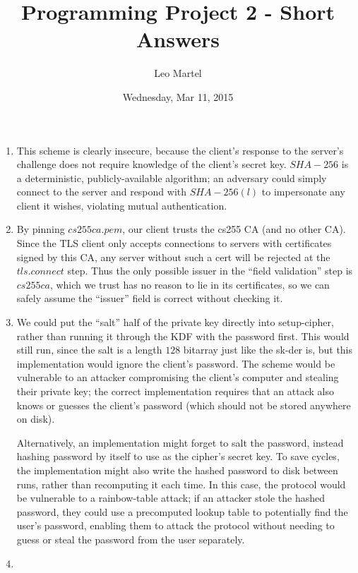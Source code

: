 \documentclass{article}[12pt]
\title{Programming Project 2 - Short Answers}
\author{Leo Martel}
\date{Wednesday, Mar 11, 2015}
\begin{document}
\maketitle

\begin{enumerate}[1.]

\item This scheme is clearly insecure, because the client's response to the server's challenge does not require knowledge of the client's secret key. $SHA-256$ is a deterministic, publicly-available algorithm; an adversary could simply connect to the server and respond with $SHA-256(l)$ to impersonate any client it wishes, violating mutual authentication.

\item By pinning $cs255ca.pem$, our client trusts the cs255 CA (and no other CA). Since the TLS client only accepts connections to servers with certificates signed by this CA, any server without such a cert will be rejected at the $tls.connect$ step. Thus the only possible issuer in the ``field validation'' step is $cs255ca$, which we trust has no reason to lie in its certificates, so we can safely assume the ``issuer'' field is correct without checking it.

\item We could put the ``salt'' half of the private key directly into setup-cipher, rather than running it through the KDF with the password first. This would still run, since the salt is a length $128$ bitarray just like the sk-der is, but this implementation would ignore the client's password. The scheme would be vulnerable to an attacker compromising the client's computer and stealing their private key; the correct implementation requires that an attack also knows or guesses the client's password (which should not be stored anywhere on disk).

Alternatively, an implementation might forget to salt the password, instead hashing password by itself to use as the cipher's secret key. To save cycles, the implementation might also write the hashed password to disk between runs, rather than recomputing it each time. In this case, the protocol would be vulnerable to a rainbow-table attack; if an attacker stole the hashed password, they could use a precomputed lookup table to potentially find the user's password, enabling them to attack the protocol without needing to guess or steal the password from the user separately.

\item


\end{enumerate}
\end{document}
